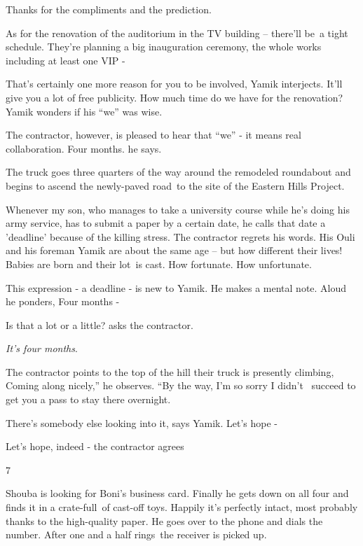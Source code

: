 \documentclass[12pt]{book}
\begin{document}
{\textquotedbl}Thanks for the compliments and the prediction.{\textquotedbl}

{\textquotedbl}As for the renovation of the auditorium in the TV building -- there'll be~a tight schedule. They're
planning a big inauguration ceremony, the whole works including at least one VIP -{\textquotedbl}

{\textquotedbl}That's certainly one more reason for you to be involved,{\textquotedbl} Yamik interjects.
{\textquotedbl}It'll give you a lot of free publicity. How much time do we have for the renovation?{\textquotedbl}
Yamik wonders if his ``we'' was wise.

The contractor, however, is pleased to hear that ``we'' - it means real collaboration. {\textquotedbl}Four
months.{\textquotedbl} he says.

The truck goes three quarters of the way around the remodeled roundabout and begins to ascend the newly-paved road~to
the site of the Eastern Hills Project.

{\textquotedbl}Whenever my son, who manages{ }to take a university course while he's doing his army
service, has to submit a paper by a certain date, he calls that date a 'deadline' because of the killing
stress.{\textquotedbl} The contractor regrets his words. His Ouli and his foreman Yamik are about the same age -- but
how different their lives! Babies are born and their lot~is cast. How fortunate. How unfortunate.

This expression - {\textquotedbl}a deadline{\textquotedbl} - is new to Yamik. He makes a mental note. Aloud he ponders,
{\textquotedbl}Four months -{\textquotedbl}

{\textquotedbl}Is that a lot or a little?{\textquotedbl} asks the contractor.

{\textquotedbl}\textit{It's four months}.{\textquotedbl}

The contractor points to the top of the hill their truck is presently climbing, {\textquotedbl}Coming along nicely,'' he
observes. ``By the way, I'm so sorry I didn't \ succeed to get you a pass to stay there overnight.{\textquotedbl}

{\textquotedbl}There's somebody else looking into it,{\textquotedbl} says Yamik. {\textquotedbl}Let's hope
-{\textquotedbl}

{\textquotedbl}Let's hope, indeed -{\textquotedbl} the contractor agrees


\bigskip

7 \

Shouba is looking for Boni's business card. Finally he gets down on all four and finds it in a crate-full~of cast-off
toys. Happily it's perfectly intact, most probably thanks to the high-quality paper. He goes over to the phone and
dials the number. After one and a half rings~the receiver is picked up.
\end{document}
